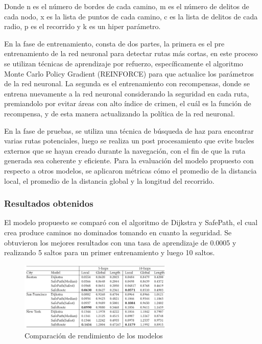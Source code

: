 Donde n es el número de bordes de cada camino, m es el número de delitos de cada nodo, x es la lista de puntos de cada camino, c es la lista de delitos de cada radio, p es el recorrido y k es un hiper parámetro.

En la fase de entrenamiento, consta de dos partes, la primera es el pre entrenamiento de la red neuronal para detectar rutas más cortas, en este proceso se utilizan técnicas de aprendizaje por refuerzo, específicamente el algoritmo Monte Carlo Policy Gradient (REINFORCE) para que actualice los parámetros de la red neuronal. La segunda es el entrenamiento con recompensas, donde se entrena nuevamente a la red neuronal considerando la seguridad en cada ruta, premiandolo por evitar áreas con alto índice de crimen, el cuál es la función de recompensa, y de esta manera actualizando la política de la red neuronal.

En la fase de pruebas, se utiliza una técnica de búsqueda de haz para encontrar varias rutas potenciales, luego se realiza un post procesamiento que evite bucles externos que se hayan creado durante la navegación, con el fin de que la ruta generada sea coherente y eficiente.
Para la evaluación del modelo propuesto con respecto a otros modelos, se aplicaron métricas cómo el promedio de la distancia local, el promedio de la distancia global y la longitud del recorrido. 

\subsubsection{Resultados obtenidos}
El modelo propuesto se comparó con el algoritmo de Dijkstra y SafePath, el cual crea produce caminos no dominados tomando en cuanto la seguridad. Se obtuvieron los mejores resultados con una tasa de aprendizaje de 0.0005 y realizando 5 saltos para un primer entrenamiento y luego 10 saltos. %

\begin{figure}[h]
	\begin{center}
		\includegraphics[width=0.65\textwidth]{2/figures/resultSafe.jpg}
		\caption{Comparación de rendimiento de los modelos}
		\label{1:fig2}
	\end{center}
\end{figure}

